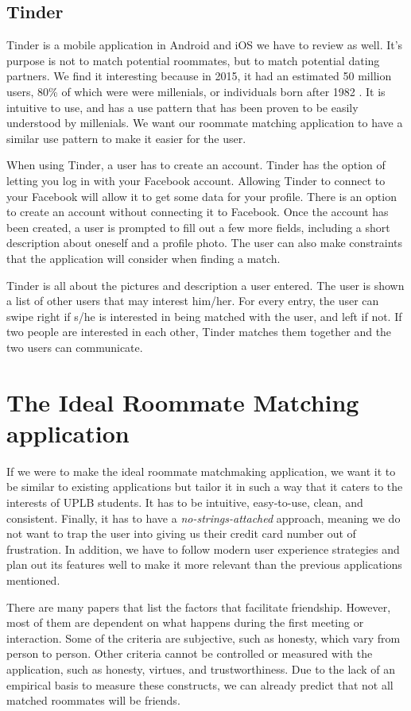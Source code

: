 \documentclass[journal]{./IEEE/IEEEtran}
\begin{document}
\subsection{Tinder}
Tinder is a mobile application in Android and iOS we have to review as well. It's purpose is not to match potential roommates, but to match potential dating partners. We find it interesting because in 2015, it had an estimated 50 million users\cite{tinderstat2}, 80\% of which were were millenials, or individuals born after 1982 \cite{tinderstat}\cite{millenial}. It is intuitive to use, and has a use pattern that has been proven to be easily understood by millenials. We want our roommate matching application to have a similar use pattern to make it easier for the user.

When using Tinder, a user has to create an account. Tinder has the option of letting you log in with your Facebook account. Allowing Tinder to connect to your Facebook will allow it to get some data for your profile. There is an option to create an account without connecting it to Facebook. Once the account has been created, a user is prompted to fill out a few more fields, including a short description about oneself and a profile photo. The user can also make constraints that the application will consider when finding a match.

Tinder is all about the pictures and description a user entered. The user is shown a list of other users that may interest him/her. For every entry, the user can swipe right if s/he is interested in being matched with the user, and left if not. If two people are interested in each other, Tinder matches them together and the two users can communicate.

\section{The Ideal Roommate Matching application}
If we were to make the ideal roommate matchmaking application, we want it to be similar to existing applications but tailor it in such a way that it caters to the interests of UPLB students. It has to be intuitive, easy-to-use, clean, and consistent. Finally, it has to have a \textit{no-strings-attached} approach, meaning we do not want to trap the user into giving us their credit card number out of frustration. In addition, we have to follow modern user experience strategies and plan out its features well to make it more relevant than the previous applications mentioned.

There are many papers that list the factors that facilitate friendship. However, most of them are dependent on what happens during the first meeting or interaction. Some of the criteria are subjective, such as honesty, which  vary from person to person. Other criteria cannot be controlled or measured with the application, such as honesty, virtues, and trustworthiness. Due to the lack of an empirical basis to measure these constructs, we can already predict that not all matched roommates will be friends.
\end{document}
